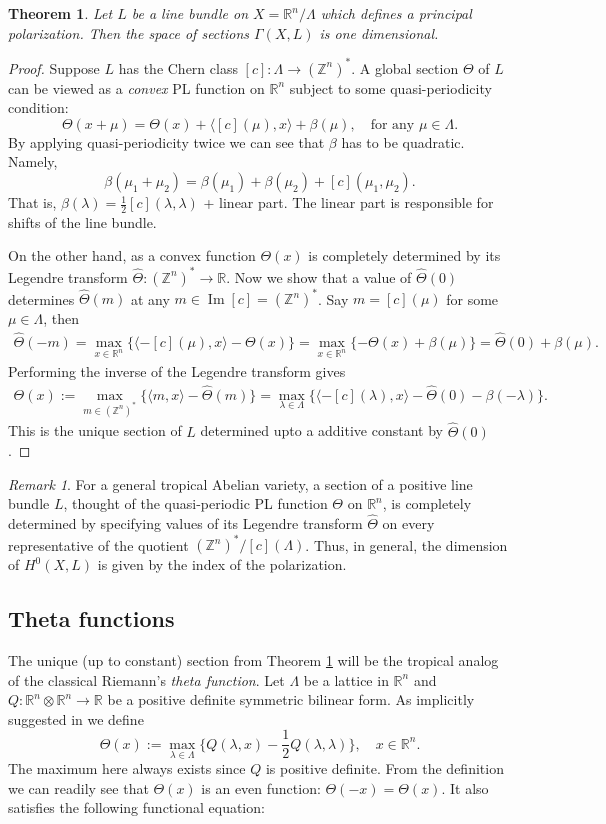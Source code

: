 \documentclass[12pt]{amsart}
\theoremstyle{plain}
\newtheorem{theorem}{Theorem}[section]
\theoremstyle{definition}
\theoremstyle{remark}
\newtheorem*{remark}{Remark}
\newcommand{\Z}{\mathbb Z}    %
\newcommand{\R}{\mathbb R}    %
\newcommand{\<}{\langle}   %
\renewcommand{\>}{\rangle} %
\begin{document}
\begin{theorem}\label{thm:polarization}
Let $L$ be a line bundle on $X=\R^n/\Lambda$ which defines a principal
polarization. Then the space of sections $\Gamma(X,L)$ is one dimensional.
\end{theorem}
\begin{proof}
Suppose $L$ has the Chern class $[c]:\Lambda\to(\Z^n)^*$. A global section
$\Theta$ of $L$ can be viewed as a {\em convex} PL function on $\R^n$ subject
to some quasi-periodicity condition:
$$\Theta(x+\mu)=\Theta(x) + \<[c](\mu), x\> + \beta(\mu), \quad \text{for any }
\mu\in \Lambda.$$
By applying quasi-periodicity twice we can see that $\beta$ has to be quadratic.
Namely,
$$\beta(\mu_1+\mu_2)=\beta(\mu_1)+\beta(\mu_2)+[c](\mu_1,\mu_2).$$
That is, $\beta(\lambda)=\frac12 [c](\lambda,\lambda)$ + linear part. The linear
part is responsible for shifts of the line bundle.

On the other hand, as a convex function $\Theta(x)$ is completely determined by
its Legendre transform $\hat\Theta:(\Z^n)^*\to\R$. Now we show that a value of
$\hat\Theta(0)$ determines $\hat\Theta(m)$ at any $m\in \operatorname{Im}[c]
= (\Z^n)^*$. Say $m=[c](\mu)$ for some $\mu\in\Lambda$, then
\begin{multline*}\hat\Theta(-m)=\max_{x\in\R^n}\{\<-[c](\mu), x\>-\Theta(x)\}
=\max_{x\in\R^n}\{-\Theta(x)+\beta(\mu)\}= \hat\Theta(0)+\beta(\mu).
\end{multline*}
Performing the inverse of the Legendre transform
gives
\begin{multline*}
\Theta(x):=\max_{m\in(\Z^n)^*}\{\<m,x\>-\hat\Theta(m)\}
=\max_{\lambda\in\Lambda}\{\<-[c](\lambda), x\>-\hat\Theta(0)-\beta(-\lambda)\}.
\end{multline*}
This is the unique section of $L$ determined upto a additive constant by
$\hat\Theta(0)$.
\end{proof}

\begin{remark}
For a general tropical Abelian variety, a section of a positive line bundle $L$,
thought of the quasi-periodic PL function $\Theta$ on $\R^n$, is completely
determined by specifying values of its Legendre transform $\hat\Theta$ on every
representative of the quotient $(\Z^n)^*/[c](\Lambda)$. Thus, in general, the
dimension of $H^0(X,L)$ is given by the index of the polarization.
\end{remark}


\subsection{Theta functions}
The unique (up to constant) section from Theorem \ref{thm:polarization}
will be the tropical analog of the classical Riemann's {\em theta function}.
Let $\Lambda$ be a lattice in $\R^n$ and $Q: \R^n\otimes \R^n \to \R$
be a positive definite symmetric bilinear form.
As implicitly suggested in \cite{Alexeev-Nakamura} we define
$$\Theta(x):=\max_{\lambda\in\Lambda} \{Q(\lambda,x) - \frac12
Q(\lambda,\lambda)\}, \quad x\in \R^n.$$
The maximum here always exists since $Q$ is positive definite. From the
definition we can readily see that $\Theta(x)$ is an even function:
$\Theta(-x)=\Theta(x)$. It also satisfies the following functional equation:
\end{document}
